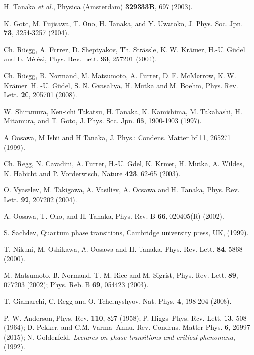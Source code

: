 \documentclass[aps,prl,showpacs,twocolumn,groupedaddress]{revtex4-1}
\begin{document}
	
\begin{thebibliography}{1}
H. Tanaka {\it et al.}, Physica (Amsterdam) {\bf 329333B}, 697 (2003).

      K. Goto, M. Fujisawa, T. Ono, H. Tanaka, and Y. Uwatoko, J. Phys. Soc. Jpn. {\bf 73}, 3254-3257 (2004).

     Ch. R\"uegg, A. Furrer, D. Sheptyakov, Th. Str\"assle, K. W. Kr\"amer, H.-U. G\"udel and  L. M\'el\'esi, Phys. Rev. Lett. {\bf 93}, 257201 (2004).
 	
	 Ch. R\"uegg, B. Normand, M. Matsumoto, A. Furrer, D. F. McMorrow, K. W. Kr\"amer, H. -U. G\"udel, S. N. Gvasaliya, H. Mutka and M. Boehm, Phys. Rev. Lett. {\bf 20},    205701 (2008).

       W. Shiramura, Ken-ichi Takatsu, H. Tanaka, K. Kamishima, M. Takahashi, H. Mitamura, and T. Goto, J. Phys. Soc. Jpn. {\bf 66}, 1900-1903 (1997).

       A Oosawa, M Ishii and H Tanaka, J. Phys.: Condens. Matter {bf 11}, 265271 (1999). 

	Ch. Regg, N. Cavadini, A. Furrer, H.-U. Gdel, K. Krmer, H. Mutka, A. Wildes, K. Habicht and P. Vorderwisch, Nature {\bf 423}, 62-65 (2003).
	
       O. Vyaselev, M. Takigawa, A. Vasiliev, A. Oosawa and H. Tanaka, Phys. Rev. Lett. {\bf 92}, 207202 (2004).

       A. Oosawa, T. Ono, and H. Tanaka, Phys. Rev. B {\bf 66}, 020405(R) (2002).

      S. Sachdev, Quantum phase transitions, Cambridge university press, UK, (1999).

	T. Nikuni, M. Oshikawa, A. Oosawa and H. Tanaka, Phys. Rev. Lett. {\bf 84}, 5868 (2000).

        M. Matsumoto, B. Normand, T. M. Rice and M. Sigrist, Phys. Rev. Lett. {\bf 89}, 077203 (2002); Phys. Reb. B {\bf 69}, 054423 (2003).

      T. Giamarchi, C. Regg and O. Tchernyshyov, Nat. Phys. {\bf 4}, 198-204 (2008).

     P. W. Anderson, Phys. Rev. {\bf 110}, 827 (1958); P. Higgs, Phys. Rev. Lett. {\bf 13}, 508 (1964); D. Pekker. and C.M. Varma, Annu. Rev. Condens. Matter Phys.  {\bf 6}, 26997 (2015); 
 N. Goldenfeld, {\it Lectures on phase transitions and critical phenomena}, (1992).


\end{thebibliography}
\end{document}
